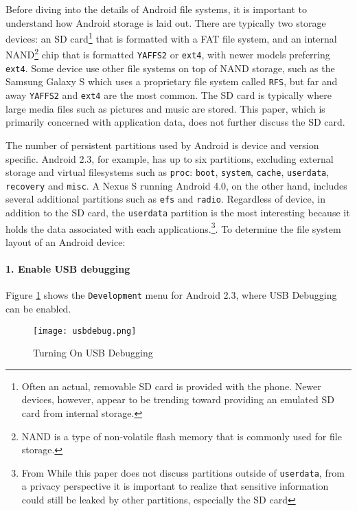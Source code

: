 Before diving into the details of Android file systems, it is important to understand how Android storage is laid out.  There are
typically two storage devices: an SD card\footnote{Often an actual, removable SD card is provided with the phone. Newer devices,
however, appear to be trending toward providing an emulated SD card from internal storage.} that is formatted with a FAT file
system, and an internal NAND\footnote{NAND is a type of non-volatile flash memory that is commonly used for file storage.} chip that
is formatted \texttt{YAFFS2} or \texttt{ext4}, with newer models preferring \texttt{ext4}. Some device use other file systems on top
of NAND storage, such as the Samsung Galaxy S which uses a proprietary file system called \texttt{RFS}, but far and away
\texttt{YAFFS2} and \texttt{ext4} are the most common. The SD card is typically where large media files such as pictures and music
are stored. This paper, which is primarily concerned with application data, does not further discuss the SD card.

The number of persistent partitions used by Android is device and version specific.  Android 2.3, for example, has up to six
partitions, excluding external storage and virtual filesystems such as \texttt{proc}: \texttt{boot}, \texttt{system},
\texttt{cache}, \texttt{userdata}, \texttt{recovery} and \texttt{misc}. A Nexus S running Android 4.0, on the other hand, includes
several additional partitions such as \texttt{efs} and \texttt{radio}. Regardless of device, in addition to the SD card, the
\texttt{userdata} partition is the most interesting because it holds the data associated with each applications.\footnote{From While
this paper does not discuss partitions outside of \texttt{userdata}, from a privacy perspective it is important to realize that
sensitive information could still be leaked by other partitions, especially the SD card}. To determine the file system layout of an Android device:

\paragraph {1. Enable USB debugging} 
Figure \ref{fig:usbdebug} shows the \texttt{Development} menu for Android 2.3, where USB Debugging can be
enabled.  

\begin{figure}[htb]
\begin{center}\texttt{[image: usbdebug.png]}\end{center}
\caption{Turning On USB Debugging}
\label{fig:usbdebug}
\end{figure}

